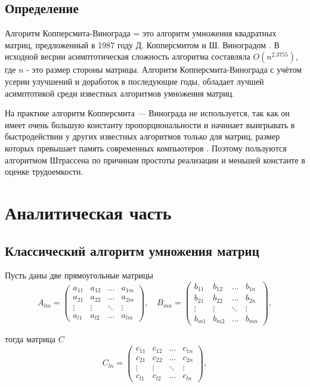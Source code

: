 \documentclass[12pt]{report}
\begin{document}
\section*{Определение}
Алгоритм Копперсмита-Винограда = это алгоритм умножения квадратных матриц, предложенный в 1987 году Д. Копперсмитом и Ш. Виноградом \cite{CoppersmithAndWinograd}. В исходной весрии асимптотическая сложность алгоритма составляла $O(n^{2.3755})$, где $n$ - это размер стороны матрицы. Алгоритм Копперсмита-Винограда с учётом усерии улучшений и доработок в последующие годы, обладает лучшей асимптотикой среди известных алгоритмов умножения матриц.

На практике алгоритм Копперсмита — Винограда не используется, так как он имеет очень большую константу пропорциональности и начинает выигрывать в быстродействии у других известных алгоритмов только для матриц, размер которых превышает память современных компьютеров \cite{RobinsonSara}.
Поэтому пользуются алгоритмом Штрассена по причинам простоты реализации и меньшей константе в оценке трудоемкости.

\chapter{Аналитическая часть}

\section{Классический алгоритм умножения матриц}

Пусть даны две прямоугольные матрицы
\begin{equation}
	A_{lm} = \begin{pmatrix}
		a_{11} & a_{12} & \ldots & a_{1m}\\
		a_{21} & a_{22} & \ldots & a_{2m}\\
		\vdots & \vdots & \ddots & \vdots\\
		a_{l1} & a_{l2} & \ldots & a_{lm}
	\end{pmatrix},
	\quad
	B_{mn} = \begin{pmatrix}
		b_{11} & b_{12} & \ldots & b_{1n}\\
		b_{21} & b_{22} & \ldots & b_{2n}\\
		\vdots & \vdots & \ddots & \vdots\\
		b_{m1} & b_{m2} & \ldots & b_{mn}
	\end{pmatrix},
\end{equation}

тогда матрица $C$
\begin{equation}
	C_{ln} = \begin{pmatrix}
		c_{11} & c_{12} & \ldots & c_{1n}\\
		c_{21} & c_{22} & \ldots & c_{2n}\\
		\vdots & \vdots & \ddots & \vdots\\
		c_{l1} & c_{l2} & \ldots & c_{ln}
	\end{pmatrix},
\end{equation}
\end{document}
